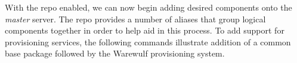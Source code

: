 With the \FSP{} repo enabled, we can now begin adding desired components onto the
{\em master} server. The \FSP{} repo provides a number of aliases that group
logical components together in order to help aid in this process. To add
support for provisioning services, the following commands illustrate addition
of a common base package followed by the Warewulf provisioning system.
